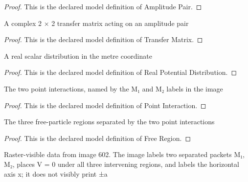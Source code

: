 \begin{proof}
  This is the declared model definition of Amplitude Pair.
\end{proof}
\begin{definition}
  \label{def:physics:phyx-mini-0602:phyxminiproblems-problemphyxmini0602-transfermatrix}
  A complex 2 × 2 transfer matrix acting on an amplitude pair
\end{definition}
\begin{proof}
  This is the declared model definition of Transfer Matrix.
\end{proof}
\begin{definition}
  \label{def:physics:phyx-mini-0602:phyxminiproblems-problemphyxmini0602-realpotentialdistribution}
  A real scalar distribution in the metre coordinate
\end{definition}
\begin{proof}
  This is the declared model definition of Real Potential Distribution.
\end{proof}
\begin{definition}
  \label{def:physics:phyx-mini-0602:phyxminiproblems-problemphyxmini0602-pointinteraction}
  The two point interactions, named by the M₁ and M₂ labels in the image
\end{definition}
\begin{proof}
  This is the declared model definition of Point Interaction.
\end{proof}
\begin{definition}
  \label{def:physics:phyx-mini-0602:phyxminiproblems-problemphyxmini0602-freeregion}
  The three free-particle regions separated by the two point interactions
\end{definition}
\begin{proof}
  This is the declared model definition of Free Region.
\end{proof}
\begin{definition}
  \label{def:physics:phyx-mini-0602:phyxminiproblems-problemphyxmini0602-supplieddoubledeltafigure}
  Raster-visible data from image 602. The image labels two separated packets M₁, M₂, places V = 0 under all three intervening regions, and labels the horizontal axis x; it does not visibly print ±a
\end{definition}
